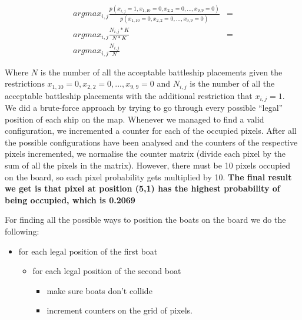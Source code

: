 \documentclass[11pt,a4paper,oneside]{report}
\begin{document}
\begin{align*}
argmax_{i,j}\frac{p(x_{i,j}=1,x_{1,10}=0,x_{2,2}=0,...,x_{9,9}=0)}{p(x_{1,10}=0,x_{2,2}=0,...,x_{9,9}=0)}&=\\
argmax_{i,j}\frac{N_{i,j}*K}{N*K}&=\\
argmax_{i,j}\frac{N_{i,j}}{N}
\end{align*}

Where $N$ is the number of all the acceptable battleship placements given the restrictions $x_{1,10}=0,x_{2,2}=0,...,x_{9,9}=0$ and $N_{i,j}$ is the number of all the acceptable battleship placements with the additional restriction that $x_{i,j}=1$.\\
We did a brute-force approach by trying to go through every possible “legal” position of each ship on the map. Whenever we managed to find a valid configuration, we incremented a counter for each of the occupied pixels. After all the possible configurations have been analysed and the counters of the respective pixels incremented, we normalise the counter matrix (divide each pixel by the sum of all the pixels in the matrix). However, there must be 10 pixels occupied on the board, so each pixel probability gets multiplied by 10. \textbf{The final result we get is that pixel at position (5,1) has the highest probability of being occupied, which is 0.2069}

For finding all the possible ways to position the boats on the board we do the following:
\begin{itemize}
 \item for each legal position of the first boat
  \begin{itemize}
  \item for each legal position of the second boat
      \begin{itemize}
      \item make sure boats don't collide
      \item increment counters on the grid of pixels.
      \end{itemize}
  \end{itemize}
\end{itemize}
\end{document}
